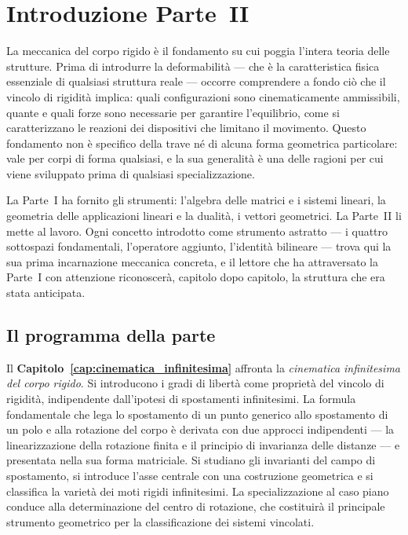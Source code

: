 
\chapter*{Introduzione Parte~II}


La meccanica del corpo rigido è il fondamento su cui poggia l'intera teoria delle strutture.
Prima di introdurre la deformabilità --- che è la caratteristica fisica essenziale di qualsiasi
struttura reale --- occorre comprendere a fondo ciò che il vincolo di rigidità implica: quali
configurazioni sono cinematicamente ammissibili, quante e quali forze sono necessarie per
garantire l'equilibrio, come si caratterizzano le reazioni dei dispositivi che limitano il
movimento. Questo fondamento non è specifico della trave né di alcuna forma geometrica
particolare: vale per corpi di forma qualsiasi, e la sua generalità è una delle ragioni per cui
viene sviluppato prima di qualsiasi specializzazione.

La Parte~I ha fornito gli strumenti: l'algebra delle matrici e i sistemi lineari, la geometria
delle applicazioni lineari e la dualità, i vettori geometrici. La
Parte~II li mette al lavoro. Ogni concetto introdotto come strumento astratto --- i quattro
sottospazi fondamentali, l'operatore aggiunto, l'identità bilineare --- trova qui la sua prima
incarnazione meccanica concreta, e il lettore che ha attraversato la Parte~I con attenzione
riconoscerà, capitolo dopo capitolo, la struttura che era stata anticipata.

\section*{Il programma della parte}

Il \textbf{Capitolo~\ref{cap:cinematica_infinitesima}} affronta la \emph{cinematica
	infinitesima del corpo rigido}. Si introducono i gradi di libertà come proprietà del vincolo
di rigidità, indipendente dall'ipotesi di spostamenti infinitesimi. La formula fondamentale
che lega lo spostamento di un punto generico allo spostamento di un polo e alla rotazione
del corpo è derivata con due approcci indipendenti --- la linearizzazione della rotazione
finita e il principio di invarianza delle distanze --- e presentata nella sua forma matriciale.
Si studiano gli invarianti del campo di spostamento, si introduce l'asse centrale con una
costruzione geometrica e si classifica la varietà dei moti rigidi infinitesimi. La
specializzazione al caso piano conduce alla determinazione del centro di rotazione, che
costituirà il principale strumento geometrico per la classificazione dei sistemi vincolati.

